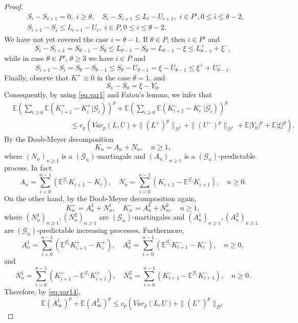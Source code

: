 \documentclass[11pt,a4paper,reqno]{amsart}
\theoremstyle{definition}
\numberwithin{equation}{section}
\begin{document}
\begin{proof}
\begin{equation*}
\begin{split}
&S_i-S_{i+1}=0,\,\, i\ge \theta, \quad S_i-S_{i+1}\le L_i-U_{i+1},\,\, i\in P', 0\le i\le \theta-2,\\
&S_{i+1}-S_i\le L_{i+1}-U_i,\,\, i\in P, 0\le i\le \theta-2.
\end{split}
\end{equation*}
We have not yet covered  the case  $i=\theta-1$. If $\theta\in P$, then 
$i\in P'$ and 
\[
S_i-S_{i+1}=S_{\theta-1}-S_\theta\le L_{\theta-1}-S_{\theta}=L_{\theta-1}-\xi\le L^+_{\theta-1}+\xi^-,
\]
while   in  case $\theta\in P'$, $\theta\ge 3$ we have $i\in P$ and
\[
S_{i+1}-S_i=S_{\theta}-S_{\theta-1}\le S_\theta-U_{\theta-1}=\xi-U_{\theta-1}\le \xi^++U^-_{\theta-1}.
\]
Finally, observe that $K^+\equiv 0$ in the case $\theta=1$, and
\[
S_1-S_0=\xi-Y_0.
\]
Consequently, by using  \eqref{eq.var1} and Fatou's lemma, we infer that  
\begin{equation}
\label{eq.var14}
\begin{split}
&\mathbb E \left (\sum_{i\ge 0} \mathbb E(K^+_{i+1}-K^+_i|\mathcal G_i)\right)^p+
\mathbb E\left (\sum_{i\ge 0} \mathbb E(K^-_{i+1}-K^-_i|\mathcal G_i)\right)^p\\&\qquad\qquad\qquad\qquad
\le c_p\left(Var_p(L,U)+\|(L^+)^p\|_{\mathcal D^1}+\|(U^-)^p\|_{\mathcal D^1}+\mathbb E|Y_0|^p+\mathbb E|\xi|^p\right).
\end{split}
\end{equation}
By the Doob-Meyer decomposition
\[
K_n=A_n+N_n,\quad n\ge 1,
\]
where $(N_n)_{n\ge 1}$ is a    $(\mathcal G_n)$-martingale and $(A_n)_{n\ge 1}$ is a  
$(\mathcal G_n)$-predictable process. In fact
\[
A_n=\sum_{i=0}^{n-1}(\mathbb E^{\mathcal G_i}K_{i+1}-K_{i}),\quad N_n
= \sum_{i=0}^{n-1}(K_{i+1}-\mathbb E^{\mathcal G_i}K_{i+1}),\quad n\ge 0.
\]
On the other hand, by the Doob-Meyer decomposition again,
\[
K^+_n=A^1_n+N^1_n,\quad K^-_n=A^2_n+N^2_n,\quad n\ge 1,
\]
where $(N^1_n)_{n\ge 1}, (N^2_n)_{n\ge 1}$ are     $(\mathcal G_n)$-martingales and 
$(A^1_n)_{n\ge 1}, (A^2_n)_{n\ge 1}$ are   $(\mathcal G_n)$-predictable increasing processes. Furthermore,
\[
A^1_n=\sum_{i=0}^{n-1}(\mathbb E^{\mathcal G_i}K^+_{i+1}-K^+_{i}),\quad 
A^2_n=\sum_{i=0}^{n-1}(\mathbb E^{\mathcal G_i}K^-_{i+1}-K^-_{i}),\quad n\ge 0,
\]
and
\[
N^1_n= \sum_{i=0}^{n-1}(K^+_{i+1}-\mathbb E^{\mathcal G_i}K^+_{i+1}),\quad
N^2_n= \sum_{i=0}^{n-1}(K^-_{i+1}-\mathbb E^{\mathcal G_i}K^-_{i+1}),\quad  n\ge 0.
\]
Therefore,  by \eqref{eq.var14},
\begin{equation}
\label{eq.tripaa}
\mathbb E(A^1_\infty)^p+\mathbb E(A^2_\infty)^p\le c_p\left(Var_p(L,U)+\|(L^+)^p\|_{\mathcal D^1}

\end{equation}
\end{proof}
\end{document}
